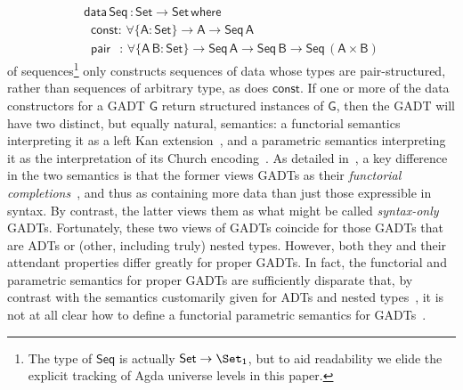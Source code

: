\documentclass[sigplan,screen]{acmart}
\begin{document}
\begin{equation}\label{eq:seq}
\begin{array}{l}
\mathsf{data\, Seq\,: Set \to Set\,where}\\
\mathsf{\;\;const :\, \forall \{A : Set\} \to A \to Seq\,A}\\
\mathsf{\;\;pair\;\;\, :\,\forall \{A\,B : Set\} \to Seq \,A \to Seq\,B \to
  Seq\,(A \times B)}
\end{array}
\end{equation}
\noindent
of sequences\footnote{The type of $\mathsf{Seq}$ is actually
  $\mathsf{Set \to \Set_1}$, but to aid readability we elide the
  explicit tracking of Agda universe levels in this paper.} only
constructs sequences of data whose types are pair-structured, rather
than sequences of arbitrary type, as does $\mathsf{const}$. If one or
more of the data constructors for a GADT $\mathsf{G}$ return
structured instances of $\mathsf{G}$, then the GADT will have two
distinct, but equally natural, semantics: a functorial semantics
interpreting it as a left Kan extension~\cite{mac71}, and a parametric
semantics interpreting it as the interpretation of its Church
encoding~\cite{atk12,vw10}. As detailed in~\cite{jg21}, a key
difference in the two semantics is that the former views GADTs as
their {\em functorial completions}~\cite{jp19}, and thus as containing
more data than just those expressible in syntax. By contrast, the
latter views them as what might be called {\em syntax-only}\/
GADTs. Fortunately, these two views of GADTs coincide for those GADTs
that are ADTs or (other, including truly) nested types.  However, both
they and their attendant properties differ greatly for proper
GADTs. In fact, the functorial and parametric semantics for proper
GADTs are sufficiently disparate that, by contrast with the semantics
customarily given for ADTs and nested
types~\cite{bfss90,gjfor15,jgj21f}, it is not at all clear how to
define a functorial parametric semantics for GADTs~\cite{jg21}.
\end{document}

